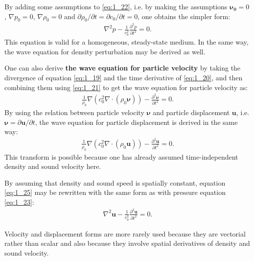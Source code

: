         By adding some assumptions to \ref{eq:1_22}, i.e. by making the assumptions $\bm{\nu_0}=0$, $\nabla p_0=0$, $\nabla \rho_0=0$ and $\partial
\rho_0/\partial t = \partial c_0 / \partial t = 0$, one obtains the simpler form:
        \begin{align} \label{eq:1_23}
            \nabla^2 p-\frac{1}{c_0^2}\frac{\partial^2 p}{\partial t^2}=0.
        \end{align}
        This equation is valid for a homogeneous, steady-state medium.
        In the same way, the wave equation for density perturbation may be derived as well.

        One can also derive \textbf{the wave equation for particle velocity} by taking the divergence of equation \ref{eq:1_19} and the time derivative of
\ref{eq:1_20}, and then combining them using \ref{eq:1_21} to get the wave equation for particle velocity as:
        \begin{align} \label{eq:1_24}
            \frac{1}{\rho_0}\nabla(c_0^2\nabla\cdot(\rho_0\bm{\nu}))-\frac{\partial^2 \bm{\nu}}{\partial t^2} = 0.
        \end{align}
        By using the relation between particle velocity $\bm{\nu}$ and particle displacement $\bm{u}$, i.e. $\bm{\nu}=\partial \bm{u}/\partial t$, the
wave equation for particle displacement is derived in the same way:
        \begin{align} \label{eq:1_25}
            \frac{1}{\rho_0}\nabla(c_0^2\nabla\cdot(\rho_0\bm{u}))-\frac{\partial^2 \bm{u}}{\partial t^2} = 0.
        \end{align}
        This transform is possible because one has already assumed time-independent density and sound velocity here.

        By assuming that density and sound speed is spatially constant, equation \ref{eq:1_25} may be rewritten with the same form as with pressure equation
\ref{eq:1_23}:
        \begin{align} \label{eq:1_26}
            \nabla^2 \bm{u}-\frac{1}{c_0^2}\frac{\partial^2 \bm{u}}{\partial t^2}=0.
        \end{align}

        Velocity and displacement forms are more rarely used because they are vectorial rather than scalar and also because they involve spatial derivatives of density and
sound velocity.

